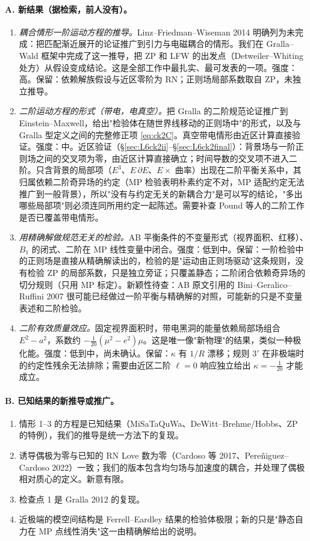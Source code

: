 \documentclass[11pt,a4paper]{ctexart}
\numberwithin{equation}{section}
\begin{document}
\paragraph{A. 新结果（据检索，前人没有）。}
\begin{enumerate}
\item \emph{耦合情形一阶运动方程的推导。}Linz--Friedman--Wiseman 2014 明确列为未完成：把匹配渐近展开的论证推广到引力与电磁耦合的情形。我们在 Gralla--Wald 框架中完成了这一推导，把 ZP 和 LFW 的出发点（Detweiler--Whiting 处方）从假设变成结论。这是全部工作中最扎实、最可发表的一项。强度：高。保留：依赖解族假设与近区零阶为 RN；正则场局部系数取自 ZP，未独立推导。
\item \emph{二阶运动方程的形式（带电，电真空）。}把 Gralla 的二阶规范论证推广到 Einstein--Maxwell，给出"检验体在随世界线移动的正则场中"的形式，以及与 Gralla 型定义之间的完整修正项 \eqref{eq:ck2C}。真空带电情形由近区计算直接验证。强度：中。近区验证（\S\ref{sec:L6ck2ii}--\S\ref{sec:L6ck2final}）：背景场与一阶正则场之间的交叉项为零，由近区计算直接确立；时间导数的交叉项不进入二阶。只含背景的局部项（$E^3$、$E\,\partial E$、$E\times$ 曲率）出现在二阶平衡关系中，其归属依赖二阶奇异场的约定（MP 检验表明朴素约定不对，MP 适配约定无法推广到一般背景），所以"没有与约定无关的新耦合力"是可以写的结论，"多出哪些局部项"则必须连同所用约定一起陈述。需要补查 Pound 等人的二阶工作是否已覆盖带电情形。
\item \emph{用精确解做规范无关的检验。}AB 平衡条件的不变量形式（视界面积、红移）、$B_1$ 的闭式、二阶在 MP 线性变量中闭合。强度：低到中。保留：一阶检验中的正则场是直接从精确解读出的，检验的是"运动由正则场驱动"这条规则，没有检验 ZP 的局部系数，只是独立旁证；只覆盖静态；二阶闭合依赖奇异场的切分规则（只用 MP 标定）。新颖性待查：AB 原文引用的 Bini--Geralico--Ruffini 2007 很可能已经做过一阶平衡与精确解的对照，可能新的只是不变量表述和二阶检验。
\item \emph{二阶有效质量效应。}固定视界面积时，带电黑洞的能量依赖局部场组合 $E^2-a^2$，系数约 $-\tfrac1{20}(\mu^2-e^2)\mu$。这是唯一像"新物理"的结果，类似一种极化能。强度：低到中，尚未确认。保留：$\kappa$ 有 $1/R$ 漂移；规则 3$'$ 在非极端时的约定性残余无法排除；需要由近区二阶 $\ell=0$ 响应独立给出 $\kappa=-\tfrac1{20}$ 才能成立。
\end{enumerate}

\paragraph{B. 已知结果的新推导或推广。}
\begin{enumerate}
\item 情形 1--3 的方程是已知结果（MiSaTaQuWa、DeWitt--Brehme/Hobbs、ZP 的特例），我们的推导是统一方法下的复现。
\item 诱导偶极为零与已知的 RN Love 数为零（Cardoso 等 2017、Pere\~niguez--Cardoso 2022）一致；我们的版本包含均匀场与加速度的耦合，并处理了偶极相对质心的定义。新意有限。
\item 检查点 1 是 Gralla 2012 的复现。
\item 近极端的模空间结构是 Ferrell--Eardley 结果的检验体极限；新的只是"静态自力在 MP 点线性消失"这一由精确解给出的说明。
\end{enumerate}
\end{document}
